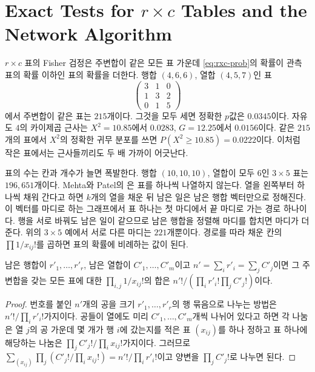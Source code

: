 \section{Exact Tests for \texorpdfstring{$r\times c$}{r x c} Tables and the Network Algorithm}
\label{sec:network}

$r\times c$ 표의 Fisher 검정은 주변합이 같은 모든 표 가운데 \eqref{eq:rxc-prob}의 확률이 관측 표의 확률 이하인 표의 확률을 더한다. 행합 $(4,6,6)$, 열합 $(4,5,7)$인 표
\[
\begin{pmatrix}3&1&0\\1&3&2\\0&1&5\end{pmatrix}
\]
에서 주변합이 같은 표는 $215$개이다. 그것을 모두 세면 정확한 $p$값은 $0.0345$이다. 자유도 $4$의 카이제곱 근사는 $X^2=10.85$에서 $0.0283$, $G=12.25$에서 $0.0156$이다. 같은 $215$개의 표에서 $X^2$의 정확한 귀무 분포를 쓰면 $P(X^2\ge10.85)=0.0222$이다. 이처럼 작은 표에서는 근사들끼리도 두 배 가까이 어긋난다.

표의 수는 칸과 개수가 늘면 폭발한다. 행합 $(10,10,10)$, 열합이 모두 $6$인 $3\times5$ 표는 $196{,}651$개이다. Mehta와 Patel의 은 표를 하나씩 나열하지 않는다\cite{mehta1983}. 열을 왼쪽부터 하나씩 채워 간다고 하면 $k$개의 열을 채운 뒤 남은 일은 남은 행합 벡터만으로 정해진다. 이 벡터를 마디로 하는 그래프에서 표 하나는 첫 마디에서 끝 마디로 가는 경로 하나이다. 행을 서로 바꿔도 남은 일이 같으므로 남은 행합을 정렬해 마디를 합치면 마디가 더 준다. 위의 $3\times5$ 예에서 서로 다른 마디는 $221$개뿐이다. 경로를 따라 채운 칸의 $\prod1/x_{ij}!$를 곱하면 표의 확률에 비례하는 값이 된다.

\begin{lemma}
\label{lem:completion-sum}
남은 행합이 $r'_1,\dots,r'_r$, 남은 열합이 $C'_1,\dots,C'_m$이고 $n'=\sum_ir'_i=\sum_jC'_j$이면 그 주변합을 갖는 모든 표에 대한 $\prod_{i,j}1/x_{ij}!$의 합은 $n'!/(\prod_ir'_i!\prod_jC'_j!)$이다.
\end{lemma}

\begin{proof}
번호를 붙인 $n'$개의 공을 크기 $r'_1,\dots,r'_r$의 행 묶음으로 나누는 방법은 $n'!/\prod_ir'_i!$가지이다. 공들이 열에도 미리 $C'_1,\dots,C'_m$개씩 나뉘어 있다고 하면 각 나눔은 열 $j$의 공 가운데 몇 개가 행 $i$에 갔는지를 적은 표 $(x_{ij})$를 하나 정하고 표 하나에 해당하는 나눔은 $\prod_jC'_j!/\prod_ix_{ij}!$가지이다. 그러므로 $\sum_{(x_{ij})}\prod_j(C'_j!/\prod_ix_{ij}!)=n'!/\prod_ir'_i!$이고 양변을 $\prod_jC'_j!$로 나누면 된다.
\end{proof}

